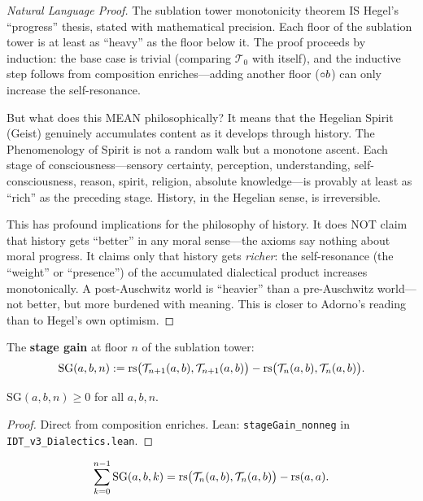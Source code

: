 \begin{proof}[Natural Language Proof]
The sublation tower monotonicity theorem IS Hegel's ``progress'' thesis,
stated with mathematical precision. Each floor of the sublation tower
is at least as ``heavy'' as the floor below it. The proof proceeds by
induction: the base case is trivial (comparing $\mathcal{T}_0$ with itself),
and the inductive step follows from composition enriches---adding another
floor ($\circ b$) can only increase the self-resonance.

But what does this MEAN philosophically? It means that the Hegelian Spirit
(Geist) genuinely accumulates content as it develops through history. The
Phenomenology of Spirit is not a random walk but a monotone ascent. Each
stage of consciousness---sensory certainty, perception, understanding, self-
consciousness, reason, spirit, religion, absolute knowledge---is provably
at least as ``rich'' as the preceding stage. History, in the Hegelian sense,
is irreversible.

This has profound implications for the philosophy of history. It does NOT
claim that history gets ``better'' in any moral sense---the axioms say
nothing about moral progress. It claims only that history gets \emph{richer}:
the self-resonance (the ``weight'' or ``presence'') of the accumulated
dialectical product increases monotonically. A post-Auschwitz world is
``heavier'' than a pre-Auschwitz world---not better, but more burdened with
meaning. This is closer to Adorno's reading than to Hegel's own optimism.
\end{proof}

\begin{definition}
\label{def:stage-gain}
The \textbf{stage gain} at floor $n$ of the sublation tower:
\[
\mathrm{SG}(a, b, n) := \mathrm{rs}\bigl(\mathcal{T}_{n+1}(a, b),
\mathcal{T}_{n+1}(a, b)\bigr) - \mathrm{rs}\bigl(\mathcal{T}_n(a, b),
\mathcal{T}_n(a, b)\bigr).
\]
\end{definition}

\begin{theorem}
\label{thm:stage-gain-nonneg}
$\mathrm{SG}(a, b, n) \geq 0$ for all $a, b, n$.
\end{theorem}

\begin{proof}
Direct from composition enriches.
Lean: \texttt{stageGain\_nonneg} in \texttt{IDT\_v3\_Dialectics.lean}.
\end{proof}

\begin{theorem}
\label{thm:gain-telescopes}
\[
\sum_{k=0}^{n-1} \mathrm{SG}(a, b, k) =
\mathrm{rs}\bigl(\mathcal{T}_n(a, b), \mathcal{T}_n(a, b)\bigr) - \mathrm{rs}(a, a).
\]
\end{theorem}

